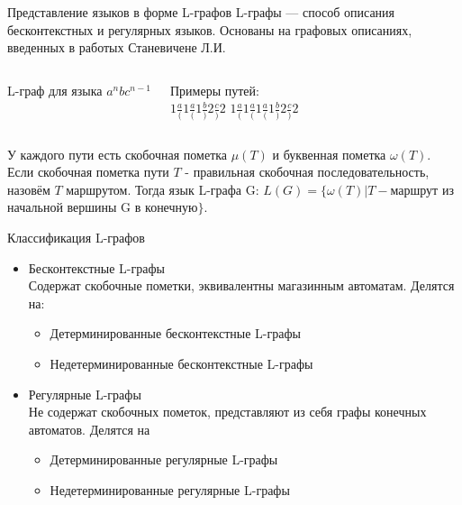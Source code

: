 \documentclass{beamer}
\begin{document}
\begin{frame}{Представление языков в форме L-графов}
L-графы --- способ описания бесконтекстных и регулярных языков. Основаны на графовых описаниях, введенных в работых Станевичене Л.И.
\begin{columns}
    L-граф для языка $a^nbc^{n-1}$
    Примеры путей:\\
    \LARGE{$1\frac{a}{(}1\frac{a}{(}1\frac{b}{)}2\frac{c}{)}2$}
    \vspace{0.8cm}
    \LARGE{$1\frac{a}{(}1\frac{a}{(}1\frac{a}{(}1\frac{b}{)}2\frac{c}{)}2$}\\
\end{columns}
У каждого пути есть скобочная пометка $\mu(T)$ и буквенная пометка $\omega(T)$. Если скобочная пометка пути $T$ - правильная скобочная последовательность, назовём $T$ маршрутом. Тогда язык L-графа G: $L(G) = \{\omega(T)|T-$маршрут из начальной вершины G в конечную$\}$.
\end{frame}

\begin{frame} {Классификация L-графов}
\begin{itemize}
  \item Бесконтекстные L-графы\\
    Содержат скобочные пометки, эквивалентны магазинным автоматам. Делятся на:
    \begin{itemize}
      \item Детерминированные бесконтекстные L-графы
      \item Недетерминированные бесконтекстные L-графы
    \end{itemize}
  \item Регулярные L-графы\\
  Не содержат скобочных пометок, представляют из себя графы конечных автоматов. Делятся на\\
  \begin{itemize}
      \item Детерминированные регулярные L-графы
      \item Недетерминированные регулярные L-графы
    \end{itemize}
\end{itemize}
\end{frame}
\end{document}
